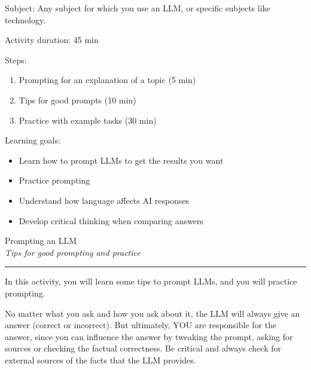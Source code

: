 \documentclass[12pt]{article}
\begin{document}
\vspace*{0.5\textheight}

Subject: Any subject for which you use an LLM, or specific subjects like technology.

Activity duration: 45 min

\vspace{0.5cm}

Steps:
\begin{enumerate}
    \item Prompting for an explanation of a topic  (5 min)
    \item Tips for good prompts (10 min)
    \item Practice with example tasks (30 min)
\end{enumerate}

Learning goals:

\begin{itemize}
    \item	Learn how to prompt LLMs to get the results you want
\item	Practice prompting 
\item	Understand how language affects AI responses 
\item	Develop critical thinking when comparing answers 

\end{itemize}

\newpage

\begin{center}
    {\Huge \color{maincolor} Prompting an LLM}\\[5pt]
    {\large \textit{Tips for good prompting and practice}}\\
    \rule{\linewidth}{1pt}
\end{center}

\vspace{0.5cm}

In this activity, you will learn some tips to prompt LLMs, and you will practice prompting.

\begin{importantbox}
    No matter what you ask and how you ask about it, the LLM will always give an answer (correct or incorrect). But ultimately, YOU are responsible for the answer, since you can influence the answer by tweaking the prompt, asking for sources or checking the factual correctness. Be critical and always check for external sources of the facts that the LLM provides.
\end{importantbox}
\end{document}
